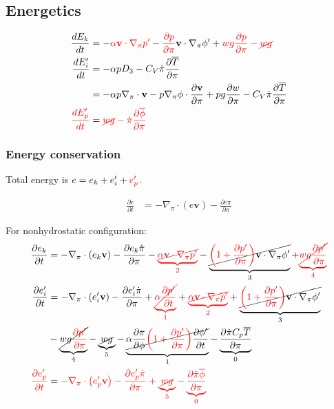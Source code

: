 \documentclass[12pt]{article}
\numberwithin{equation}{section}
\renewcommand{\d}[2]{\frac{d #1}{d #2}}
\newcommand{\dt}[1]{\d{#1}{t}}
\newcommand{\pd}[2]{\frac{\partial #1}{\partial #2}}
\newcommand{\pdt}[1]{\pd{#1}{t}}
\newcommand{\pdz}[1]{\pd{#1}{\pi}}
\renewcommand{\vec}[1]{\mathbf{#1}}
\newcommand{\grad}[2][\pi]{\nabla_{#1} #2}
\renewcommand{\div}[2][\pi]{\nabla_{#1} \cdot #2}
\begin{document}
\subsection{Energetics}

\begin{align*}
  \dt{E_k} & = - {\color{red}\alpha \vec{v} \cdot \nabla_\pi p^\prime} - {\color{red}\pd{p}{\pi}} \vec{v} \cdot \nabla_\pi \phi^\prime + {\color{red}w g \pd{p}{\pi} - \cancel{w g}} \\
  \dt{E_i^\prime} & = - \alpha p D_3 - C_V \dot{\pi} \pdz{\overline{T}} \\
  & = - \alpha p \div{\vec{v}} - p \grad{\phi} \cdot \pd{\vec{v}}{\pi} + p g \pd{w}{\pi} - C_V \dot{\pi} \pdz{\overline{T}} \\
  {\color{red}\dt{E_p^\prime}} & = {\color{red}\cancel{w g} - \dot{\pi} \pd{\overline{\phi}}{\pi}}
\end{align*}

\subsubsection{Energy conservation}

Total energy is $e = e_k + e_i^\prime + {\color{red}e_p^\prime}$.

\begin{align*}
  \pdt{e} & = - \nabla_\pi \cdot \left(e \vec{v}\right) - \pdz{e \dot{\pi}}
\end{align*}

For nonhydrostatic configuration:
\begin{align*}
  \pdt{e_k} & = - \nabla_\pi \cdot \left(e_k \vec{v}\right) - \pdz{e_k \dot{\pi}} - {\color{red}\underbrace{\cancel{\alpha \vec{v} \cdot \nabla_\pi p^\prime}}_2} - \underbrace{\cancel{{\color{red}\left(1 + \pd{p^\prime}{\pi}\right)} \vec{v} \cdot \nabla_\pi \phi^\prime}}_3 + {\color{red}\underbrace{\cancel{w g \pd{p^\prime}{\pi}}}_4} \\
  \pdt{e_i^\prime} & = - \nabla_\pi \cdot \left(e_i^\prime \vec{v}\right) - \pdz{e_i^\prime \dot{\pi}} + {\color{red}\underbrace{\cancel{\alpha \pdt{p^\prime}}}_1} + {\color{red}\underbrace{\cancel{\alpha \vec{v} \cdot \nabla_\pi p^\prime}}_2} + \underbrace{\cancel{{\color{red}\left(1 + \pd{p^\prime}{\pi}\right)} \vec{v} \cdot \nabla_\pi \phi^\prime}}_3 \\
  & - \underbrace{\cancel{w g {\color{red}\pd{p^\prime}{\pi}}}}_4 - \underbrace{\cancel{w g}}_5 - \underbrace{\cancel{\alpha \pd{\pi}{\phi} {\color{red}\left(1 + \pd{p^\prime}{\pi}\right)} \pdt{\phi^\prime}}}_1 - \underbrace{\pd{\dot{\pi} C_p \overline{T}}{\pi}}_0 \\
  {\color{red}\pdt{e_p^\prime}} & = {\color{red}- \nabla_\pi \cdot \left(e_p^\prime \vec{v}\right) - \pdz{e_p^\prime \dot{\pi}} + \underbrace{\cancel{w g}}_5 - \underbrace{\pd{\dot{\pi} \overline{\phi}}{\pi}}_0}
\end{align*}
\end{document}
